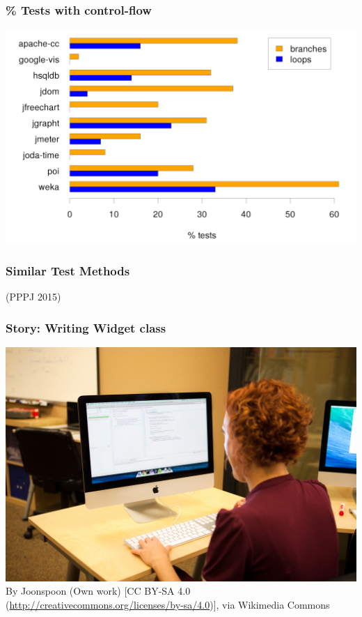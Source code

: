 \documentclass{beamer}
\begin{document}
\begin{frame}
  \frametitle{\% Tests with control-flow}
\begin{center}
\includegraphics[width=\textwidth, height=.8\textheight, keepaspectratio=true]{images/control-flow.png}
\end{center}
\end{frame}

\begin{frame}
  \frametitle{Similar Test Methods}
  (PPPJ 2015)
\end{frame}

\begin{frame}
  \frametitle{Story: Writing Widget class} {\small	
     \includegraphics[width=\textwidth, keepaspectratio=true]{images/Programmer_writing_code_with_Unit_Tests.jpg}
     \tiny
     \linebreak
     By Joonspoon (Own work) [CC BY-SA 4.0 (\url{http://creativecommons.org/licenses/by-sa/4.0})], via Wikimedia Commons
  }
\end{frame}
\end{document}
